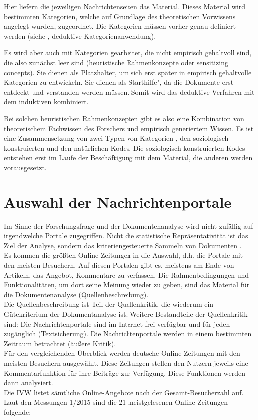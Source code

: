 Hier liefern die jeweiligen Nachrichtenseiten das Material. Dieses Material wird
bestimmten Kategorien, welche auf Grundlage des theoretischen Vorwissens
angelegt wurden, zugeordnet. Die Kategorien müssen vorher genau definiert werden
(siehe \textcite{mayring}, deduktive Kategorienanwendung).

Es wird aber auch mit Kategorien gearbeitet, die nicht empirisch gehaltvoll
sind, die also zunächst \glqq leer\grqq{} sind (\glqq heuristische
Rahmenkonzepte\grqq{} oder \glqq sensitizing concepts\grqq{}).  Sie dienen als
\glqq Platzhalter\grqq{}, um sich erst später in empirisch gehaltvolle
Kategorien zu entwickeln. Sie dienen als \glqq Starthilfe", da die Dokumente
erst entdeckt und verstanden werden müssen. Somit wird das deduktive Verfahren
mit dem induktiven kombiniert.

Bei solchen heuristischen Rahmenkonzepten gibt es also eine Kombination von
theoretischem \glqq Fachwissen des Forschers\grqq{} \autocite[S.~65]{strauss}
und empirisch generiertem Wissen. Es ist eine Zusammensetzung von zwei Typen von
Kategorien \autocite[S.~64f]{strauss}, den soziologisch konstruierten und den
natürlichen Kodes. Die soziologisch konstruierten Kodes entstehen erst im Laufe
der Beschäftigung mit dem Material, die anderen werden vorausgesetzt.


\section{Auswahl der Nachrichtenportale}

Im Sinne der Forschungsfrage und der Dokumentenanalyse wird nicht zufällig auf
irgendwelche Portale zugegriffen. Nicht die statistische Repräsentativität ist
das Ziel der Analyse, sondern das kriteriengesteuerte Sammeln von Dokumenten
\autocite{kunzler}.\\
Es kommen die \glqq größten\grqq{} Online-Zeitungen in die Auswahl, d.h. die
Portale mit den meisten Besuchern. Auf diesen Portalen gibt es, meistens am Ende
von Artikeln, das Angebot, Kommentare zu verfassen. Die Rahmenbedingungen und
Funktionalitäten, um dort seine Meinung wieder zu geben, sind das Material für
die Dokumentenanalyse (Quellenbeschreibung).\\
Die Quellenbeschreibung ist Teil der Quellenkritik, die wiederum ein
Gütekriterium der Dokumentanalyse ist. Weitere Bestandteile der Quellenkritik
sind: Die Nachrichtenportale sind im Internet frei verfügbar und für jeden
zugänglich (Textsicherung). Die Nachrichtenportale werden in einem bestimmten
Zeitraum betrachtet (äußere Kritik).\\
Für den vergleichenden Überblick werden deutsche Online-Zeitungen mit den
meisten Besuchern ausgewählt. Diese Zeitungen stellen den Nutzern jeweils eine
Kommentarfunktion für ihre Beiträge zur Verfügung.  Diese Funktionen werden dann
analysiert.\\
Die IVW listet sämtliche Online-Angebote nach der Gesamt-Besucherzahl auf.
Laut den Messungen 1/2015 sind die 21 meistgelesenen Online-Zeitungen folgende:

